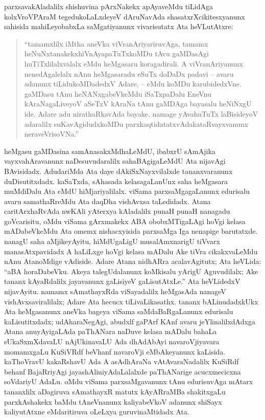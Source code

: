 parxsavakAladalilx shishuvina pArxNakekx apAyaveMdu tiLidAga kolxVroVPAraM tegedu\-koLaLxdeyeV dAruNavAda shasatxrXcikitesxyanunx sahisida mahiLeyobabxLa saMgatiyanunx vivarisutatx Ata heVLutAtxre:
\begin{quote}
``tamamxlilx iMtha aneVka viVranAriyariruvAga, tamamx heNuNxtanakekx\break hiVnAyapaTuTxkoMDu tAvu gaMDasAgi huTiTxlilalxvalalx eMdu heMga\-saru koragadirali. A viVranAriyanunx nenedAgalelalx nAnu heMgasaradu eSuTx doDaDx padavi -- avaru adanunx tiLidukoMDadedxV Adare, -- eMdu koMDu karubidedxVne. gaMDasu tAnu heNANxgabeVkeMdu iSaTx\-paDalu EneVnu kAraNagaLiveyoV aSeTxV kAraNa tAnu gaMDAga baya\-salu heNiNxgU ide. Adare adu nirathaRkavAda bayake. namage yAva\break huTuTx laBisideyoV adaralilx suKavAgidudxkoMDu parxkaqtidatatxvAda\break kataRvayxvanunx neraveVrisoVNa.''
\end{quote}

heMgasu gaMDasina samAnasakxMdhaLeMdU, ibabxrU sAmAjika vayxvahAravanunx naDesuvudaralilx sahaBAgigaLeMdU Ata nijavAgi BAvisidadx. AdudariMda Ata daye dAkiSxNayxvilalxde tananxvaranunx duDisutitxdadx. kaSaTxda, sAhasada kelasagaLanUnx saha heMgasara muMdiDalu Ata eMdU hiMjariyalilalx. viSama parxsaMgagaLanunx edurisalu avaru samathaRreMdu Ata daqDha vishAvxsa taLedidadx. Atana caritArxhaRvAda nwKAli yAterxya kAladalilx punaH punaH nanagadu goVcarisitu, oMdu viSama gArxmakekx ABA obobxMTigaLAgi hoVgi kelasa mADabeVkeMdu Ata omemx nishacxyisida parxsaMga Iga nenapige barutatxde. nanagU saha aMjikeyAyitu, hiMdUgaLigU musalAmxnarigU tiVvarx manasAtxpavidadx A haLiLxge hoVgi kelasa mADalu Ake tiVra cikakxvaLeMdu nAnu AtanoMdige vAdiside. Adare Atana nidhARra acalavAgitutx; Ata heVLida: ``aBA horaDabeVku. Akeya talegUdalanunx koMkisalu yArigU Aguvudilalx; Ake tananx kAyaRdalilx jayavanunx gaLisiyeV gaLisutAtxLe.'' Ata heVLidedxV nijavAyitu. namamx sAmathayxRda viSayadalilx heMgasAda nanageV vishAvxsaviralilalx; Adare Ata hecucx tiLivaLikasathx. tananx bALinudadxkUkx Ata heMgasanunx aneVka bageya viSama saMdaBaRgaLanunx edurisalu kaLisutitxdadx; udAharaNegAgi, abudxlf gaPArf KAnf avaru jeYlinalilxdAdxga Atana anuyAyigaLAda paThANara naDuve kelasa mADalu bahaLa sUkaSxmXdavaLU nAjUkinavaLU Ada dhAdAbAyi navaroVjiyavara momamxgaLu KuSiVRdf beVhanf navaroVji eMbAkeyanunx kaLisida. kaThoVravU kakaRshavU Ada A asAdhAraNa vAtAvaraNadalilx KuSiRdf behanf BajaRriyAgi jayashAliniyAdaLalalxde paThANarige acucxmecicxna soVdariyU AdaLu. oMdu viSama parxsaMgavanunx tAnu edurisuvAga mAtarx tananxlilx aDagiruva sAmathayxR matutx kAyARraMBa shakitxgaLu parxkAshakekx baMdu tAneVnanunx kaliyabeVkoV adanunx shiSayx kaliyutAtxne eMdaritiruva oLeLxya guruvinaMtidadx Ata.

